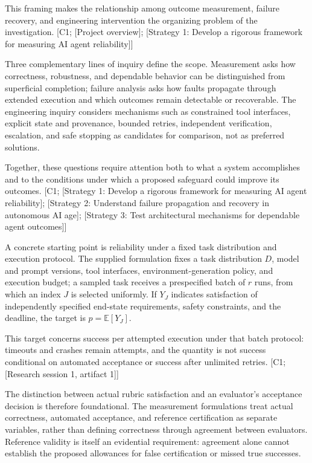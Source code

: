 \documentclass[11pt]{article}
\begin{document}
This framing makes the relationship among outcome measurement, failure recovery, and engineering intervention the organizing problem of the investigation. [C1; [Project overview]; [Strategy 1: Develop a rigorous framework for measuring AI agent reliability]]

Three complementary lines of inquiry define the scope. Measurement asks how correctness, robustness, and dependable behavior can be distinguished from superficial completion; failure analysis asks how faults propagate through extended execution and which outcomes remain detectable or recoverable. The engineering inquiry considers mechanisms such as constrained tool interfaces, explicit state and provenance, bounded retries, independent verification, escalation, and safe stopping as candidates for comparison, not as preferred solutions.

Together, these questions require attention both to what a system accomplishes and to the conditions under which a proposed safeguard could improve its outcomes. [C1; [Strategy 1: Develop a rigorous framework for measuring AI agent reliability]; [Strategy 2: Understand failure propagation and recovery in autonomous AI age]; [Strategy 3: Test architectural mechanisms for dependable agent outcomes]]

A concrete starting point is reliability under a fixed task distribution and execution protocol. The supplied formulation fixes a task distribution $D$, model and prompt versions, tool interfaces, environment-generation policy, and execution budget; a sampled task receives a prespecified batch of $r$ runs, from which an index $J$ is selected uniformly. If $Y_J$ indicates satisfaction of independently specified end-state requirements, safety constraints, and the deadline, the target is $p=\mathbb{E}[Y_J]$.

This target concerns success per attempted execution under that batch protocol: timeouts and crashes remain attempts, and the quantity is not success conditional on automated acceptance or success after unlimited retries. [C1; [Research session 1, artifact 1]]

The distinction between actual rubric satisfaction and an evaluator\textquoteright{}s acceptance decision is therefore foundational. The measurement formulations treat actual correctness, automated acceptance, and reference certification as separate variables, rather than defining correctness through agreement between evaluators. Reference validity is itself an evidential requirement: agreement alone cannot establish the proposed allowances for false certification or missed true successes.
\end{document}

